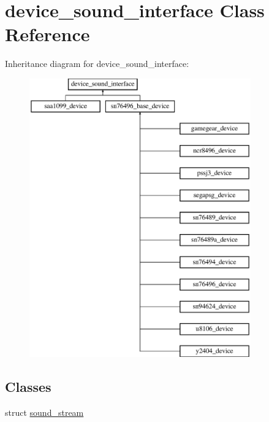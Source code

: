 \hypertarget{classdevice__sound__interface}{\section{device\-\_\-sound\-\_\-interface Class Reference}
\label{classdevice__sound__interface}
}
Inheritance diagram for device\-\_\-sound\-\_\-interface\-:\begin{figure}[H]
\begin{center}
\leavevmode
\includegraphics[height=12.000000cm]{classdevice__sound__interface}
\end{center}
\end{figure}
\subsection*{Classes}
\begin{DoxyCompactItemize}
\item 
struct \hyperlink{structdevice__sound__interface_1_1sound__stream}{sound\-\_\-stream}
\end{DoxyCompactItemize}
